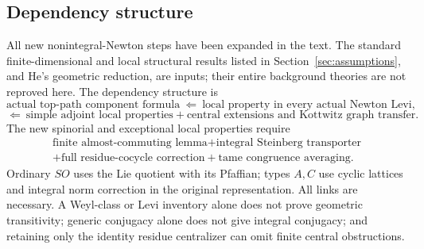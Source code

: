 \documentclass[11pt,a4paper]{article}
\theoremstyle{definition}
\theoremstyle{remark}
\begin{document}
\subsection{Dependency structure}
All new nonintegral-Newton steps have been expanded in the text.
The standard finite-dimensional and local structural results listed
in Section~\ref{sec:assumptions}, and He's geometric reduction,
are inputs; their entire background theories are not reproved here.
The dependency structure is
\[
\text{actual top-path component formula}
\ \Longleftarrow\
\text{local property in every actual Newton Levi},
\]
\[
\Longleftarrow\
\text{simple adjoint local properties}
+\text{central extensions and Kottwitz graph transfer}.
\]
The new spinorial and exceptional local properties require
\[
\begin{gathered}
\text{finite almost-commuting lemma}
+\text{integral Steinberg transporter}\\
+\text{full residue-cocycle correction}
+\text{tame congruence averaging}.
\end{gathered}
\]
Ordinary \(SO\) uses the Lie quotient with its Pfaffian; types \(A,C\)
use cyclic lattices and integral norm correction in the original
representation.
All links are necessary. A Weyl-class or Levi inventory alone does
not prove geometric transitivity; generic conjugacy alone does not
give integral conjugacy; and retaining only the identity residue
centralizer can omit finite central obstructions.
\end{document}
